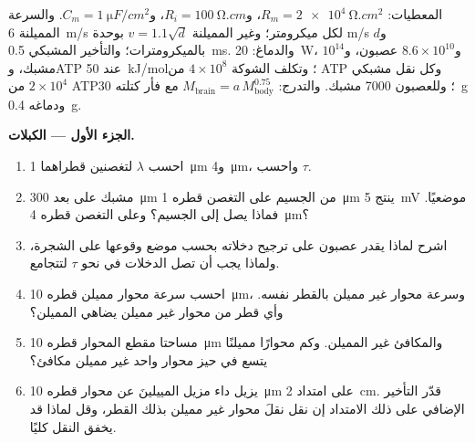 \begin{problem}
\label{pb:b3:nervous-systems:1}
المعطيات: $R_{m} = \qty{2e4}{\ohm.cm^2}$، و$R_{i} = \qty{100}{\ohm.cm}$،
و$C_{m} = \qty{1}{\micro F/cm^2}$. والسرعة المميلنة \qty{6}{m/s}
لكل ميكرومتر؛ وغير المميلنة $v = 1.1\sqrt{d}$ بوحدة m/s و$d$
بالميكرومترات؛ والتأخير المشبكي \qty{0.5}{ms}. والدماغ:
\qty{20}{W}، و$8.6\times 10^{10}$ عصبون، و$10^{14}$ مشبك، وATP
عند \qty{50}{kJ/mol}؛ وتكلف الشوكة $4\times 10^{8}$ من ATP
وكل نقل مشبكي $2\times 10^{4}$ من ATP؛ وللعصبون \num{7000}
مشبك. والتدرج: $M_{\text{brain}} = a\,M_{\text{body}}^{0.75}$
مع فأر كتلته \qty{30}{g} ودماغه \qty{0.4}{g}.

\medskip
\noindent\textbf{الجزء الأول --- الكبلات.}
\begin{enumerate}
  \item احسب $\lambda$ لتغصنين قطراهما \qty{1}{\micro m}
        و\qty{4}{\micro m}، واحسب $\tau$.
  \item مشبك على بعد \qty{300}{\micro m} من الجسيم على التغصن
        قطره \qty{1}{\micro m} ينتج \qty{5}{mV} موضعيًا. فماذا
        يصل إلى الجسيم؟ وعلى التغصن قطره \qty{4}{\micro m}؟
  \item اشرح لماذا يقدر عصبون على ترجيح دخلاته بحسب موضع
        وقوعها على الشجرة، ولماذا يجب أن تصل الدخلات في نحو
        $\tau$ لتتجامع.
  \item احسب سرعة محوار مميلن قطره \qty{10}{\micro m}، وسرعة
        محوار غير مميلن بالقطر نفسه. وأي قطر من محوار غير
        مميلن يضاهي المميلن؟
  \item مساحتا مقطع المحوار قطره \qty{10}{\micro m} والمكافئ
        غير المميلن. وكم محوارًا مميلنًا يتسع في حيز محوار
        واحد غير مميلن مكافئ؟
  \item يزيل داء مزيل  المييلينَ عن محوار قطره
        \qty{10}{\micro m} على امتداد \qty{2}{cm}. قدّر
        التأخير الإضافي على ذلك الامتداد إن نقل نقلَ محوار
        غير مميلن بذلك القطر، وقل لماذا قد يخفق النقل كليًا.
\end{enumerate}


\end{problem}
